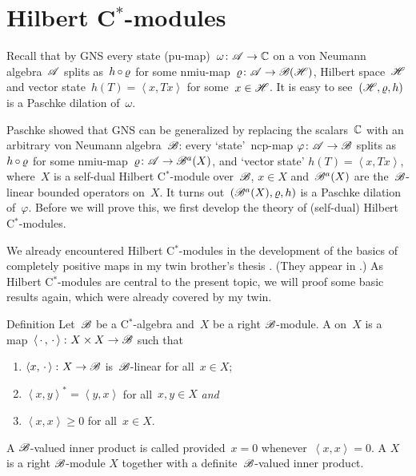 \section{Hilbert C$^*$-modules}
\begin{parsec}%
\begin{point}%
Recall that by GNS
    every state (pu-map)~$\omega\colon \mathscr{A} \to \mathbb{C}$
    on a von Neumann algebra~$\mathscr{A}$
    splits as~$h \mathop{\circ} \varrho$
    for some nmiu-map~$\varrho\colon \mathscr{A} \to \mathscr{B}(\mathscr{H})$,
        Hilbert space~$\mathscr{H}$
        and vector state~$h (T) =  \left<x, T x\right>$
         for some~$x \in \mathscr{H}$.
It is easy to see~$(\mathscr{H}, \varrho, h)$ is a Paschke dilation of~$\omega$.


Paschke showed that GNS can be generalized by replacing the scalars~$\mathbb{C}$
    with an arbitrary von Neumann algebra~$\mathscr{B}$:
    every `state'~ncp-map $\varphi\colon \mathscr{A} \to \mathscr{B}$
    splits as~$h \mathop{\circ} \varrho$
    for some nmiu-map~$\varrho\colon \mathscr{A} \to \mathscr{B}^a (X)$,
    and `vector state' $h(T) = \left<x, Tx\right>$,
    where~$X$ is a self-dual Hilbert C$^*$-module over~$\mathscr{B}$, $x \in X$
     and~$\mathscr{B}^a(X)$ are the~$\mathscr{B}$-linear bounded operators on~$X$.
It turns out~$(\mathscr{B}^a(X), \varrho, h)$
    is a Paschke dilation of~$\varphi$.
Before we will prove this,
    we first develop the theory of (self-dual) Hilbert C$^*$-modules.

We already encountered Hilbert C$^*$-modules
    in the development of the basics of completely positive maps
    in my twin brother's thesis \cite{bram}.
(They appear in .)
As Hilbert C$^*$-modules are central to the present topic,
    we will proof some basic results again, which were already
    covered by my twin.
\end{point}
\begin{point}{Definition}%
    Let~$\mathscr{B}$ be a C$^*$-algebra and~$X$
        be a right $\mathscr{B}$-module.
        A 
            on~$X$
        is a map~$\left<\,\cdot\,,\,\cdot\,\right>\colon X \times X \to \mathscr{B}$
        such that
        \begin{enumerate}
            \item $\left<x, \,\cdot\,\right> \colon X \to  \mathscr{B}$
                    is~$\mathscr{B}$-linear for all~$x \in X$;
            \item $\left<x,y\right>^* = \left<y,x\right>$
                for all~$x,y\in X$ \emph{and}
            \item $\left<x,x\right> \geq 0$ for all~$x \in X$.
        \end{enumerate}
        A $\mathscr{B}$-valued inner product is called 
        provided~$x = 0$ whenever~$\left<x,x\right>=0$.
        A  $X$
        is a right $\mathscr{B}$-module $X$
        together with a definite~$\mathscr{B}$-valued inner product.


\end{point}
\end{parsec}
